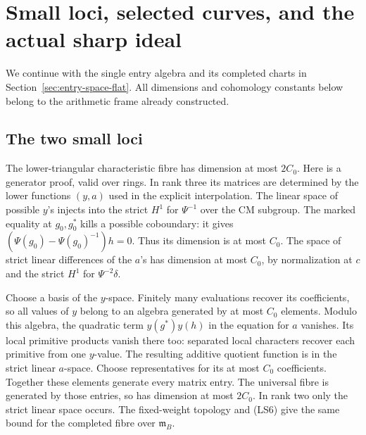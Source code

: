 \section{Small loci, selected curves, and the actual sharp ideal}
\label{sec:entry-nice-sharp}
We continue with the single entry algebra and its
completed charts in Section~\ref{sec:entry-space-flat}.
All dimensions and cohomology constants below
belong to the arithmetic frame already constructed.

\subsection{The two small loci}
The lower-triangular characteristic fibre has
dimension at most \(2C_0\).
Here is a generator proof, valid over rings.
In rank three its matrices are determined by
the lower functions \((y,a)\) used in the
explicit interpolation.
The linear space of possible \(y\)'s injects
into the strict \(H^1\) for \(\Psi^{-1}\)
over the CM subgroup.
The marked equality at \(g_0,g_0^*\) kills a
possible coboundary: it gives
\((\Psi(g_0)-\Psi(g_0)^{-1})h=0\).
Thus its dimension is at most \(C_0\).
The space of strict linear differences of
the \(a\)'s has dimension at most \(C_0\),
by normalization at \(c\) and the strict
\(H^1\) for \(\Psi^{-2}\delta\).

Choose a basis of the \(y\)-space.
Finitely many evaluations recover its
coefficients, so all values of \(y\) belong
to an algebra generated by at most \(C_0\)
elements.
Modulo this algebra, the quadratic term
\(y(g^*)y(h)\) in the equation for \(a\)
vanishes.
Its local primitive products vanish there
too: separated local characters recover
each primitive from one \(y\)-value.
The resulting additive quotient function
is in the strict linear \(a\)-space.
Choose representatives for its at most
\(C_0\) coefficients.
Together these elements generate every
matrix entry.
The universal fibre is generated by those
entries, so has dimension at most \(2C_0\).
In rank two only the strict linear space
occurs.
The fixed-weight topology and (LS6) give
the same bound for the completed fibre
over \(\mathfrak m_B\).

